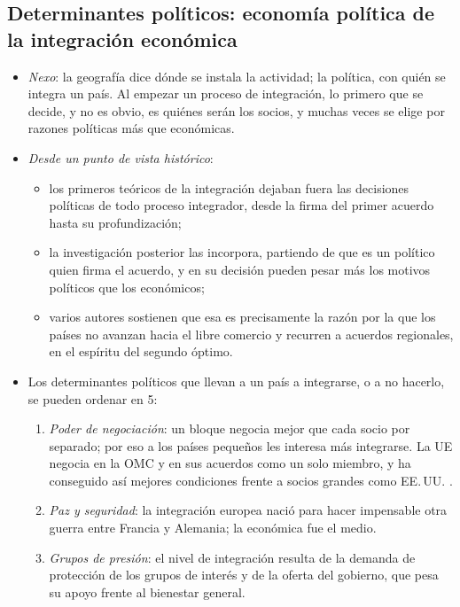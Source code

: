 \documentclass[11pt]{article}
\begin{document}
\subsection{Determinantes políticos: economía política de la integración económica}\label{sec:politicos}

\begin{itemize}
\item \emph{Nexo}: la geografía dice dónde se instala la actividad; la política, con quién se integra un país. Al empezar un proceso de integración, lo primero que se decide, y no es obvio, es quiénes serán los socios, y muchas veces se elige por razones políticas más que económicas.
\item \emph{Desde un punto de vista histórico}:
  \begin{itemize}
  \item los primeros teóricos de la integración dejaban fuera las decisiones políticas de todo proceso integrador, desde la firma del primer acuerdo hasta su profundización;
  \item la investigación posterior las incorpora, partiendo de que es un político quien firma el acuerdo, y en su decisión pueden pesar más los motivos políticos que los económicos;
  \item varios autores sostienen que esa es precisamente la razón por la que los países no avanzan hacia el libre comercio y recurren a acuerdos regionales, en el espíritu del segundo óptimo.
  \end{itemize}
\item Los determinantes políticos que llevan a un país a integrarse, o a no hacerlo, se pueden ordenar en 5:
  \begin{enumerate}
  \item \emph{Poder de negociación}: un bloque negocia mejor que cada socio por separado; por eso a los países pequeños les interesa más integrarse. La UE negocia en la OMC y en sus acuerdos como un solo miembro, y ha conseguido así mejores condiciones frente a socios grandes como EE.\,UU. .
  \item \emph{Paz y seguridad}: la integración europea nació para hacer impensable otra guerra entre Francia y Alemania; la económica fue el medio.
  \item \emph{Grupos de presión}: el nivel de integración resulta de la demanda de protección de los grupos de interés y de la oferta del gobierno, que pesa su apoyo frente al bienestar general\nocite{Rodrik1995Political}.

\end{enumerate}
\end{itemize}
\end{document}
